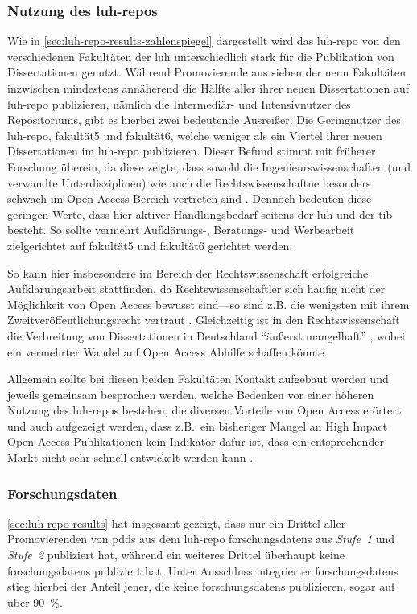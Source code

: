 \subsubsection{Nutzung des \gls{luh-repo}s}
Wie in \cref{sec:luh-repo-results-zahlenspiegel} dargestellt wird das \gls{luh-repo} von den verschiedenen Fakultäten der \gls{luh} unterschiedlich stark für die Publikation von Dissertationen genutzt.
Während Promovierende aus sieben der neun Fakultäten inzwischen mindestens annäherend die Hälfte aller ihrer neuen Dissertationen auf \gls{luh-repo} publizieren, nämlich die Intermediär- und Intensivnutzer des Repositoriums, gibt es hierbei zwei bedeutende Ausreißer:
Die Geringnutzer des \gls{luh-repo}, \gls{fakultät5} und \gls{fakultät6}, welche weniger als ein Viertel ihrer neuen Dissertationen im \gls{luh-repo} publizieren.
Dieser Befund stimmt mit früherer Forschung überein, da diese zeigte, dass sowohl die Ingenieurswissenschaften (und verwandte Unterdisziplinen) wie auch die Rechtswissenschaftne besonders schwach im Open Access Bereich vertreten sind \autocite{Archambault2014,Piwowar2018,Severin2020-Jura,Hamann2019-OA,Fischer2022-Jura}.
Dennoch bedeuten diese geringen Werte, dass hier aktiver Handlungsbedarf seitens der \gls{luh} und der \gls{tib} besteht.
So sollte vermehrt Aufklärungs-, Beratungs- und Werbearbeit zielgerichtet auf \gls{fakultät5} und \gls{fakultät6} gerichtet werden.

So kann hier insbesondere im Bereich der Rechtswissenschaft erfolgreiche Aufklärungsarbeit stattfinden, da Rechtswissenschaftler sich häufig nicht der Möglichkeit von Open Access bewusst sind---so sind z.B. die wenigsten mit ihrem Zweitveröffentlichungsrecht vertraut \autocite[91]{Eisentraut}.
Gleichzeitig ist in den Rechtswissenschaft die Verbreitung von Dissertationen in Deutschland \enquote{äußerst mangelhaft} \autocite[50]{Steinhauer2019-OA}, wobei ein vermehrter Wandel auf Open Access Abhilfe schaffen könnte.

Allgemein sollte bei diesen beiden Fakultäten Kontakt aufgebaut werden und jeweils gemeinsam besprochen werden, welche Bedenken vor einer höheren Nutzung des \gls{luh-repo}s bestehen, die diversen Vorteile von Open Access erörtert \autocite{Bautista-Puig2020} und auch aufgezeigt werden, dass z.B.~ein bisheriger Mangel an High Impact Open Access Publikationen kein Indikator dafür ist, dass ein entsprechender Markt nicht sehr schnell entwickelt werden kann \autocite{Björk2012}.

\subsubsection{Forschungsdaten}
\cref{sec:luh-repo-results} hat insgesamt gezeigt, dass nur ein Drittel aller Promovierenden von \glspl{pdd} aus dem \gls{luh-repo} \glspl{forschungsdaten} aus \textit{Stufe~1} und \textit{Stufe~2} publiziert hat, während ein weiteres Drittel überhaupt keine \glspl{forschungsdaten} publiziert hat.
Unter Ausschluss integrierter \glspl{forschungsdaten} stieg hierbei der Anteil jener, die keine \glspl{forschungsdaten} publizieren, sogar auf über \SI{90}{\percent}.

